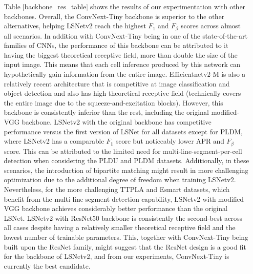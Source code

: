 \documentclass[journal]{IEEEtran}
\begin{document}
Table \ref{backbone_res_table} shows the results of our experimentation with other backbones. Overall, the ConvNext-Tiny backbone is superior to the other alternatives, helping LSNetv2 reach the highest $F_1$ and $F_\beta$ scores across almost all scenarios. In addition with ConvNext-Tiny being in one of the state-of-the-art families of CNNs, the performance of this backbone can be attributed to it having the biggest theoretical receptive field, more than double the size of the input image. This means that each cell inference produced by this network can hypothetically gain information from the entire image. Efficientnetv2-M is also a relatively recent architecture that is competitive at image classification \cite{efficientnetv2} and object detection \cite{efficientdet} and also has high theoretical receptive field (technically covers the entire image due to the squeeze-and-excitation blocks). However, this backbone is consistently inferior than the rest, including the original modified-VGG backbone. LSNetv2 with the original backbone has competitive performance versus the first version of LSNet for all datasets except for PLDM, where LSNetv2 has a comparable $F_1$ score but noticeably lower APR and $F_{\beta}$ score. This can be attributed to the limited need for multi-line-segment-per-cell detection when considering the PLDU and PLDM datasets. Additionally, in these scenarios, the introduction of bipartite matching might result in more challenging optimization due to the additional degree of freedom when training LSNetv2.%
Nevertheless, for the more challenging TTPLA and Esmart datasets, which benefit from the multi-line-segment detection capability, LSNetv2 with modified-VGG backbone achieves considerably better performance than the original LSNet. LSNetv2 with ResNet50 backbone is consistently the second-best across all cases despite having a relatively smaller theoretical receptive field and the lowest number of trainable parameters. This, together with ConvNext-Tiny being built upon the ResNet family, might suggest that the ResNet design is a good fit for the backbone of LSNetv2, and from our experiments, ConvNext-Tiny is currently the best candidate.
\end{document}
